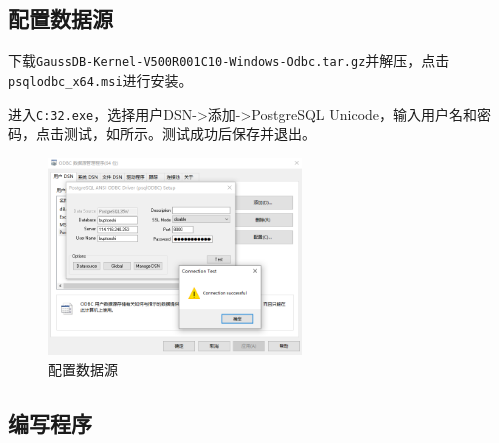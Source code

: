 \documentclass[lang=cn,11pt,a4paper,cite=authornum]{paper}
\begin{document}
\subsection{配置数据源}

下载\texttt{GaussDB-Kernel-V500R001C10-Windows-Odbc.tar.gz}并解压，点击\texttt{psqlodbc_x64.msi}进行安装。

进入\texttt{C:\Windows{}\odbcad32.exe}，选择用户DSN->添加->PostgreSQL Unicode，输入用户名和密码，点击测试，如所示。测试成功后保存并退出。

\begin{figure}[!htb]
    \centering
    \includegraphics[width=0.6\textwidth]{./images/source.png}
    \caption{配置数据源\label{fig:source}}
\end{figure}

\subsection{编写程序}
\end{document}
